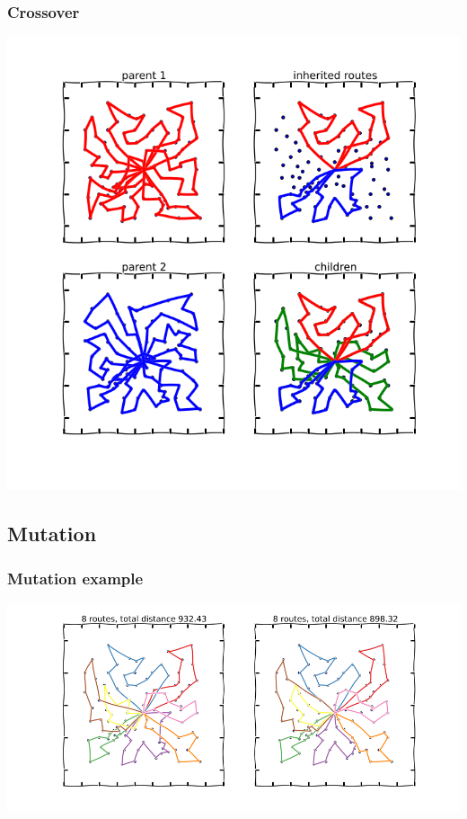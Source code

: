 \documentclass{beamer}
\begin{document}
\begin{frame}
\frametitle{Crossover}
\begin{center}
\includegraphics[scale=0.25]{figs/crossover}

\end{center}

\begin{center}
\end{center}
\end{frame}




\subsection{Mutation}


\begin{frame}
\frametitle{Mutation example}
\begin{center}
\includegraphics[scale=0.3]{figs/mutation}
\end{center}

\end{frame}
\end{document}
